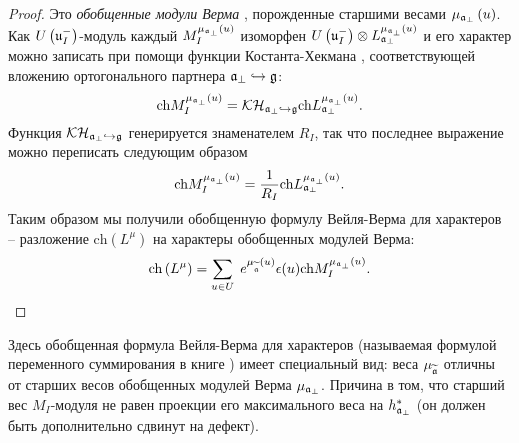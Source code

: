 \begin{proof}
Это  \textit{обобщенные модули Верма}  \cite{lepowsky1977generalization},
порожденные старшими весами  $\mu _{\frak{a}%
_{\perp }}\left( u\right) $. Как  $U\left( \frak{u}_{I}^{-}\right) $-модуль каждый  $M_{I}^{\mu _{\frak{a}_{\perp }}\left( u\right) }$ изоморфен  $%
U\left( \frak{u}_{I}^{-}\right) \otimes L_{\frak{a}_{\perp }}^{\mu _{%
\frak{a}_{\perp }}\left( u\right) }$ и его характер можно записать при помощи функции Костанта-Хекмана \cite{KostantHeckman1982}, соответствующей вложению ортогонального партнера $\frak{a}_{\perp
}\hookrightarrow \frak{g}$:
\begin{equation*}
\mathrm{ch}M_{I}^{\mu _{\frak{a}_{\perp }}\left( u\right) }=\mathcal{KH}_{%
\frak{a}_{\perp }\hookrightarrow \frak{g}}\mathrm{ch}L_{\frak{a}_{\perp
}}^{\mu _{\frak{a}_{\perp }}\left( u\right) }.
\end{equation*}
Функция  $\mathcal{KH}_{\frak{a}_{\perp }\hookrightarrow \frak{%
g}}$ генерируется знаменателем  $R_{I}$, так что последнее выражение можно переписать следующим образом
\begin{equation*}
\mathrm{ch}M_{I}^{\mu _{\frak{a}_{\perp }}\left( u\right) }=\frac{1}{R_{I}}%
\mathrm{ch}L_{\frak{a}_{\perp }}^{\mu _{\frak{a}_{\perp }}\left( u\right) }.
\end{equation*}
Таким образом мы получили обобщенную формулу Вейля-Верма для характеров -- разложение  $\mathrm{ch}\left(
L^{\mu }\right) $ на характеры обобщенных модулей Верма:
\begin{equation}
\mathrm{ch}\left( L^{\mu }\right) =\sum_{u\in U}\;e^{\mu _{\widetilde{\mathfrak{a}}}\left(
u\right) }\epsilon (u)\mathrm{ch}M_{I}^{\mu _{\frak{a}_{\perp }}\left(
u\right) }.  \label{char in gen verma mod}
\end{equation}
\end{proof}

\begin{remark}
Здесь обобщенная формула Вейля-Верма для характеров (называемая формулой переменного суммирования в книге \cite{humphreys2008representations}) имеет специальный вид: веса $\mu _{\widetilde{\mathfrak{a}}}$ отличны от старших весов обобщенных модулей Верма $\mu _{\mathfrak{a}_{\perp}}$. Причина в том, что старший вес $M_{I}$-модуля не равен проекции его максимального веса на  $h^*_{\mathfrak{a}_{\perp}}$ (он должен быть дополнительно сдвинут на дефект).
\end{remark}


